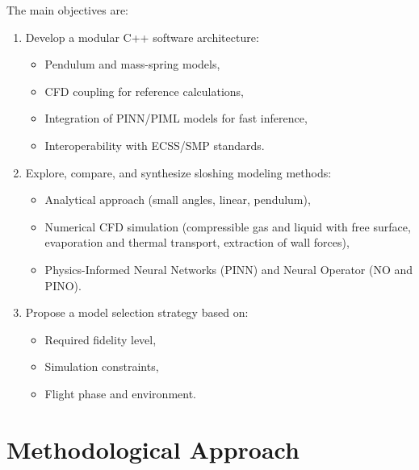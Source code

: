 \documentclass[12pt]{article}
\begin{document}
	The main objectives are:
	\begin{enumerate}
		\item Develop a modular C++ software architecture:
		\begin{itemize}
			\item Pendulum and mass-spring models,
			\item CFD coupling for reference calculations,
			\item Integration of PINN/PIML models for fast inference,
			\item Interoperability with ECSS/SMP standards.
		\end{itemize}
		\item Explore, compare, and synthesize sloshing modeling methods:
		\begin{itemize}
			\item Analytical approach (small angles, linear, pendulum),
			\item Numerical CFD simulation (compressible gas and liquid with free surface, evaporation and thermal transport, extraction of wall forces),
			\item Physics-Informed Neural Networks (PINN) and Neural Operator (NO and PINO).
		\end{itemize}
		\item Propose a model selection strategy based on:
		\begin{itemize}
			\item Required fidelity level,
			\item Simulation constraints,
			\item Flight phase and environment.
		\end{itemize}
	\end{enumerate}
	
	\section*{Methodological Approach}
	
\end{document}
